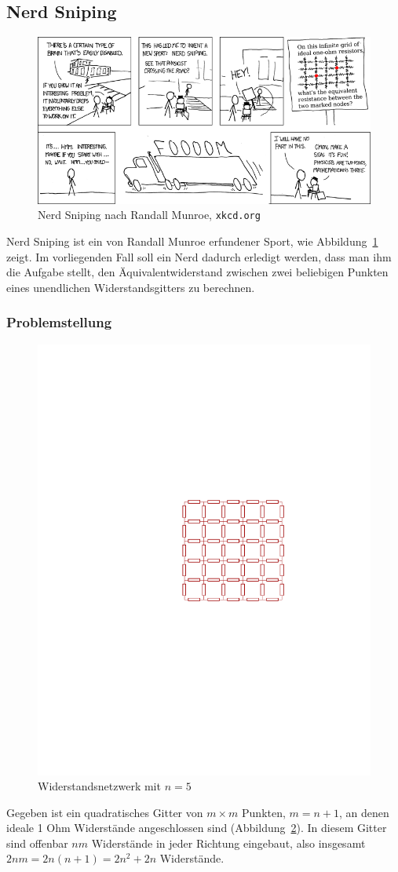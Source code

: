\subsection{Nerd Sniping}
\begin{figure}
\begin{center}
\includegraphics[width=\hsize]{graphics/nerdsniping}
\end{center}
\caption{Nerd Sniping nach Randall Munroe, {\tt xkcd.org}\label{nerdsniping}}
\end{figure}
Nerd Sniping ist ein von Randall Munroe erfundener Sport, wie
Abbildung~\ref{nerdsniping} zeigt. Im vorliegenden Fall soll
ein Nerd dadurch erledigt werden, dass man ihm die Aufgabe
stellt, den Äquivalentwiderstand zwischen zwei beliebigen
Punkten eines unendlichen Widerstandsgitters zu berechnen.

\subsubsection{Problemstellung}
\begin{figure}
\begin{center}
\includegraphics[width=0.6\hsize]{graphics/grid}
\end{center}
\caption{Widerstandsnetzwerk mit $n=5$\label{grid}}
\end{figure}
Gegeben ist ein quadratisches Gitter von $m\times m$ Punkten,
$m = n+1$, an denen ideale 1 Ohm Widerstände angeschlossen sind
(Abbildung~\ref{grid}).
In diesem Gitter sind offenbar $nm$ Widerstände in jeder Richtung
eingebaut, also insgesamt $2nm=2n(n+1)=2n^2+2n$ Widerstände.

